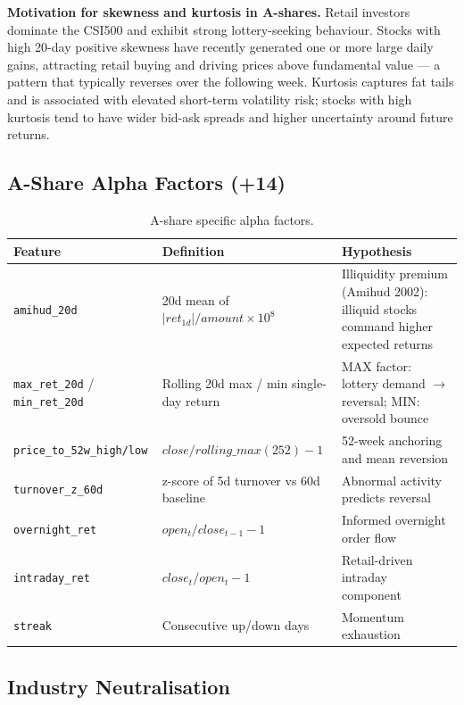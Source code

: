 \documentclass[11pt,a4paper]{article}
\begin{document}
\textbf{Motivation for skewness and kurtosis in A-shares.}
Retail investors dominate the CSI500 and exhibit strong lottery-seeking
behaviour. Stocks with high 20-day positive skewness have recently
generated one or more large daily gains, attracting retail buying and
driving prices above fundamental value --- a pattern that typically
reverses over the following week. Kurtosis captures fat tails
and is associated with elevated short-term volatility risk; stocks with
high kurtosis tend to have wider bid-ask spreads and higher uncertainty
around future returns.

\subsection{A-Share Alpha Factors (+14)}

\begin{table}[h]
\centering
\begin{tabular}{lp{5cm}p{4.5cm}}
\toprule
Feature & Definition & Hypothesis \\
\midrule
\texttt{amihud\_20d}
  & 20d mean of $|ret_{1d}| / amount \times 10^8$
  & Illiquidity premium (Amihud 2002): illiquid stocks
    command higher expected returns \\
\texttt{max\_ret\_20d} / \texttt{min\_ret\_20d}
  & Rolling 20d max / min single-day return
  & MAX factor: lottery demand $\rightarrow$ reversal;
    MIN: oversold bounce \\
\texttt{price\_to\_52w\_high/low}
  & $close / rolling\_max(252) - 1$
  & 52-week anchoring and mean reversion \\
\texttt{turnover\_z\_60d}
  & z-score of 5d turnover vs 60d baseline
  & Abnormal activity predicts reversal \\
\texttt{overnight\_ret}
  & $open_t / close_{t-1} - 1$
  & Informed overnight order flow \\
\texttt{intraday\_ret}
  & $close_t / open_t - 1$
  & Retail-driven intraday component \\
\texttt{streak}
  & Consecutive up/down days
  & Momentum exhaustion \\
\bottomrule
\end{tabular}
\caption{A-share specific alpha factors.}
\end{table}

\subsection{Industry Neutralisation}
\end{document}
